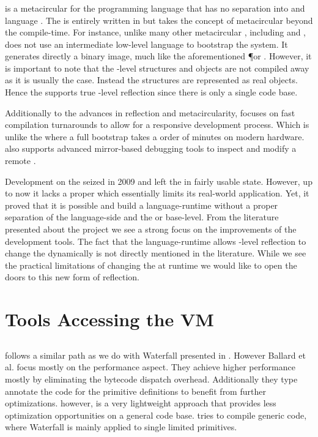 \subsubsection*{\Klein \VM}
 is a metacircular \VM for the \Self programming language that has no separation into \VM and language \cite{Unga05a}.
The \VM is entirely written in \Self but takes the concept of metacircular beyond the compile-time.
For instance, unlike many other metacircular \VMs, including \Cog and \Squeak, \Klein does not use an intermediate low-level language to bootstrap the system.
It generates directly a binary image, much like the aforementioned \P or \MIST \VM.
However, it is important to note that the \VM-level structures and objects are not compiled away as it is usually the case.
Instead the \VM structures are represented as real \Self objects.
Hence the \Klein \VM supports true \VM-level reflection since there is only a single code base.

Additionally to the advances in reflection and metacircularity, \Klein focuses on fast compilation turnarounds to allow for a responsive development process.
Which is unlike the \Squeak \VM where a full \VM bootstrap takes a order of minutes on modern hardware.
\Klein also supports advanced mirror-based debugging tools to inspect and modify a remote \VM.

Development on the \Klein \VM seized in 2009 and left the \Klein \VM in fairly usable state.
However, up to now it lacks a proper \GC which essentially limits its real-world application.
Yet, it proved that it is possible and build a language-runtime without a proper separation of the language-side and the \VM or base-level.
From the literature presented about the \Klein project we see a strong focus on the improvements of the development tools.
The fact that the language-runtime allows \VM-level reflection to change the \VM dynamically is not directly mentioned in the literature.
While we see the practical limitations of changing the \VM at runtime we would like to open the doors to this new form of reflection.


\section{Tools Accessing the VM}

\subsection*{\Quicktalk}
\Quicktalk \cite{Ball86a} follows a similar path as we do with Waterfall presented in .
However Ballard et al. focus mostly on the performance aspect.
They achieve higher performance mostly by eliminating the bytecode dispatch overhead.
Additionally they type annotate the code for the primitive definitions to benefit from further optimizations.
\WF however, is a very lightweight approach that provides less optimization opportunities on a general code base.
\Quicktalk tries to compile generic \ST code, where Waterfall is mainly applied to single limited primitives.


